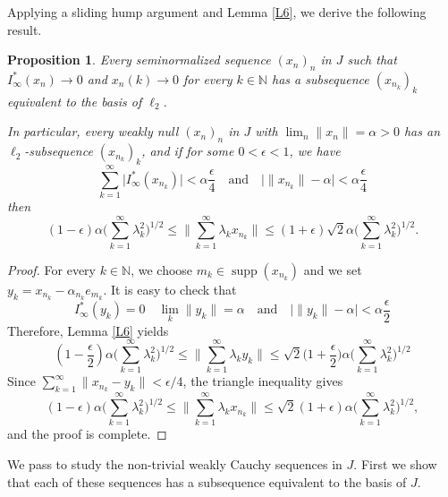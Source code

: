 \documentclass[12pt]{amsart}
\theoremstyle{plain}
\numberwithin{equation}{section}
\newcommand{\N}{\mathbb{N}}
\DeclareMathOperator{\supp}{supp}
\newtheorem{proposition}[theorem]{Proposition}
\begin{document}
Applying a sliding hump argument and Lemma \ref{L6}, we derive the following result.

\begin{proposition}\label{P5}
Every seminormalized sequence $(x_n)_n$ in $J$ such that $I_\infty^*(x_n) \to 0$ and $x_n(k) \to 0$ for every $k \in \N$ has a subsequence $(x_{n_k})_k$ equivalent to the basis of $\ell_2$.

In particular, every weakly null $(x_n)_n$ in $J$ with $\lim_n \|x_n\| = \alpha > 0$ has an $\ell_2$-subsequence $(x_{n_k})_k$, and if for some $0 < \epsilon < 1$, we have
\begin{equation}\label{eqn:eq.21}
\sum_{k=1}^\infty \Big| I_\infty^*(x_{n_k})\Big| < \alpha \frac{\epsilon}{4} \quad \text{and} \quad
\Big| \|x_{n_k}\| - \alpha \Big| < \alpha \frac{\epsilon}{4}
\end{equation}
then
\begin{equation}\label{eqn:eq.5}
(1 -\epsilon) \alpha\Big(\sum_{k=1}^\infty \lambda_k^2\Big)^{1/2} \le \Big\|\sum_{k=1}^\infty \lambda_k x_{n_k}\Big\| \le (1+\epsilon)\sqrt{2} \alpha \Big(\sum_{k=1}^\infty \lambda_k^2\Big)^{1/2}.
\end{equation}
\end{proposition}
\begin{proof}
For every $k\in \N$, we choose $m_k \in \supp(x_{n_k})$ and we set $y_k = x_{n_k} - \alpha_{n_k} e_{m_k}$.
It is easy to check that
\[ I_\infty^*(y_{k}) = 0 \quad \lim_k \|y_{k}\| = \alpha \quad \text{and} \quad \big|\|y_k\| - \alpha\big| < \alpha \frac{\epsilon}{2} \]
Therefore, Lemma \ref{L6} yields
\begin{equation}\label{eqn: eq.19}
(1 - \frac{\epsilon}{2}) \alpha \Big(\sum_{k=1}^\infty \lambda_k^2\Big)^{1/2} \le \Big\|\sum_{k=1}^\infty \lambda_k y_k\Big\| \le \sqrt{2} \Big(1 +\frac{\epsilon}{2}\Big) \alpha \Big(\sum_{k=1}^\infty \lambda_k^2\Big)^{1/2}
\end{equation}
Since
$\sum_{k=1}^\infty \|x_{n_k} - y_k\| < \epsilon/4$,
the triangle inequality gives
\begin{equation}\label{eqn: eq.20}
(1 - \epsilon) \alpha \Big(\sum_{k=1}^\infty \lambda_k^2\Big)^{1/2} \le \Big\|\sum_{k=1}^\infty \lambda_k x_{n_k}\Big\| \le \sqrt{2} (1 + \epsilon) \alpha \Big(\sum_{k=1}^\infty \lambda_k^2\Big)^{1/2},
\end{equation}
and the proof is complete.
\end{proof}

We pass to study the non-trivial weakly Cauchy sequences in $J$. First we show that each of these sequences has a subsequence equivalent to the basis of $J$.
\end{document}
